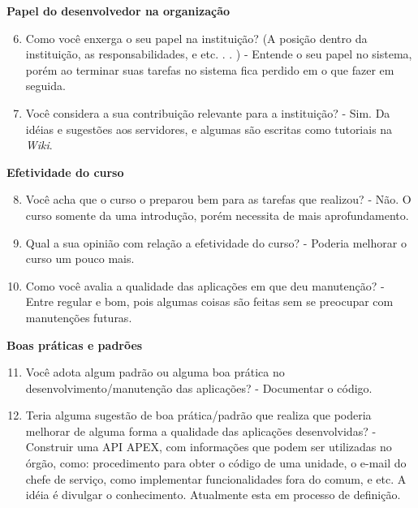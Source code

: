 \begin{anexosenv}
\textbf{Papel do desenvolvedor na organização}

\begin{enumerate}
\setcounter{enumi}{5}
\item Como você enxerga o seu papel na instituição? (A posição dentro da instituição, as
responsabilidades, e etc. . . )\newline
- Entende o seu papel no sistema, porém ao terminar suas tarefas no sistema fica perdido em o que fazer em seguida.
\item Você considera a sua contribuição relevante para a instituição?\newline
- Sim. Da idéias e sugestões aos servidores, e algumas são escritas como tutoriais na \textit{Wiki}.
\end{enumerate}

\textbf{Efetividade do curso}

\begin{enumerate}
\setcounter{enumi}{7}
\item Você acha que o curso o preparou bem para as tarefas que realizou?\newline
- Não. O curso somente da uma introdução, porém necessita de mais aprofundamento.
\item Qual a sua opinião com relação a efetividade do curso?\newline
- Poderia melhorar o curso um pouco mais.
\item Como você avalia a qualidade das aplicações em que deu manutenção?\newline
- Entre regular e bom, pois algumas coisas são feitas sem se preocupar com manutenções futuras.
\end{enumerate}

\textbf{Boas práticas e padrões}

\begin{enumerate}
\setcounter{enumi}{10}
\item Você adota algum padrão ou alguma boa prática no desenvolvimento/manutenção das
aplicações?\newline
- Documentar o código.
\item Teria alguma sugestão de boa prática/padrão que realiza que poderia melhorar de
alguma forma a qualidade das aplicações desenvolvidas?\newline
- Construir uma API APEX, com informações que podem ser utilizadas no órgão, como: procedimento para obter o código de uma unidade, o e-mail do chefe de serviço, como implementar funcionalidades fora do comum, e etc. A idéia é divulgar o conhecimento. Atualmente esta em processo de definição.
\end{enumerate}


\end{anexosenv}
